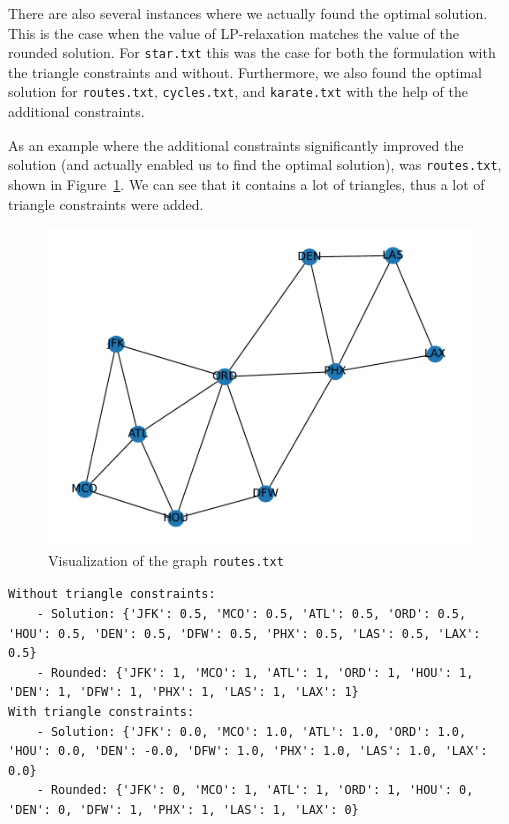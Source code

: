\documentclass{article}
\begin{document}
There are also several instances where we actually found the optimal solution. This is the case when the value of LP-relaxation matches the value of the rounded solution. For \lstinline|star.txt| this was the case for both the formulation with the triangle constraints and without. Furthermore, we also found the optimal solution for \lstinline|routes.txt|, \lstinline|cycles.txt|, and \lstinline|karate.txt| with the help of the additional constraints. 

As an example where the additional constraints significantly improved the solution (and actually enabled us to find the optimal solution), was \lstinline|routes.txt|, shown in Figure~\ref{fig:routes}. We can see that it contains a lot of triangles, thus a lot of triangle constraints were added.

\begin{figure}
    \centering
    \includegraphics[width=.8\linewidth]{Assignment4/routes.pdf}
    \caption{Visualization of the graph \lstinline|routes.txt|}
    \label{fig:routes}
\end{figure}

\begin{lstlisting}
Without triangle constraints:
	- Solution: {'JFK': 0.5, 'MCO': 0.5, 'ATL': 0.5, 'ORD': 0.5, 'HOU': 0.5, 'DEN': 0.5, 'DFW': 0.5, 'PHX': 0.5, 'LAS': 0.5, 'LAX': 0.5}
	- Rounded: {'JFK': 1, 'MCO': 1, 'ATL': 1, 'ORD': 1, 'HOU': 1, 'DEN': 1, 'DFW': 1, 'PHX': 1, 'LAS': 1, 'LAX': 1}
With triangle constraints:
	- Solution: {'JFK': 0.0, 'MCO': 1.0, 'ATL': 1.0, 'ORD': 1.0, 'HOU': 0.0, 'DEN': -0.0, 'DFW': 1.0, 'PHX': 1.0, 'LAS': 1.0, 'LAX': 0.0}
	- Rounded: {'JFK': 0, 'MCO': 1, 'ATL': 1, 'ORD': 1, 'HOU': 0, 'DEN': 0, 'DFW': 1, 'PHX': 1, 'LAS': 1, 'LAX': 0}

\end{lstlisting}







\end{document}
